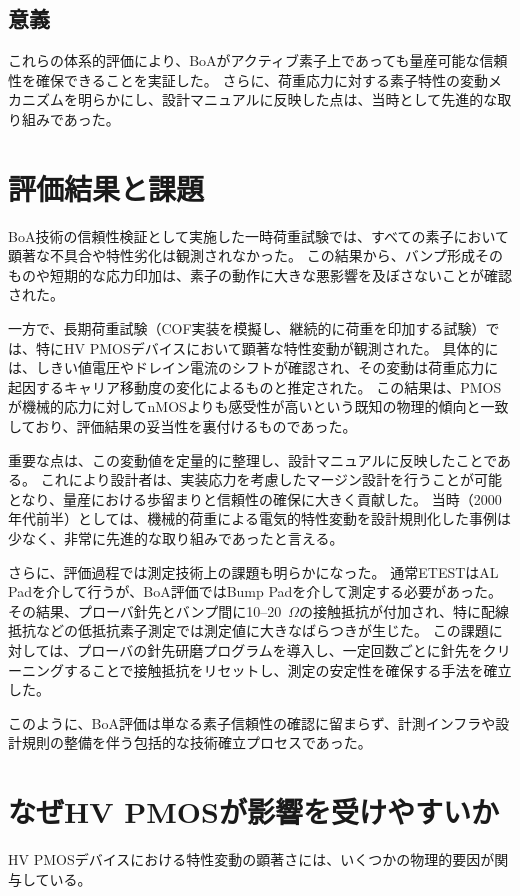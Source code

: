 \documentclass[conference]{IEEEtran}
\begin{document}
\subsection{意義}
これらの体系的評価により、BoAがアクティブ素子上であっても量産可能な信頼性を確保できることを実証した。  
さらに、荷重応力に対する素子特性の変動メカニズムを明らかにし、設計マニュアルに反映した点は、当時として先進的な取り組みであった。

\section{評価結果と課題}
BoA技術の信頼性検証として実施した一時荷重試験では、すべての素子において顕著な不具合や特性劣化は観測されなかった。  
この結果から、バンプ形成そのものや短期的な応力印加は、素子の動作に大きな悪影響を及ぼさないことが確認された。  

一方で、長期荷重試験（COF実装を模擬し、継続的に荷重を印加する試験）では、特にHV PMOSデバイスにおいて顕著な特性変動が観測された。  
具体的には、しきい値電圧やドレイン電流のシフトが確認され、その変動は荷重応力に起因するキャリア移動度の変化によるものと推定された。  
この結果は、PMOSが機械的応力に対してnMOSよりも感受性が高いという既知の物理的傾向と一致しており、評価結果の妥当性を裏付けるものであった。  

重要な点は、この変動値を定量的に整理し、設計マニュアルに反映したことである。  
これにより設計者は、実装応力を考慮したマージン設計を行うことが可能となり、量産における歩留まりと信頼性の確保に大きく貢献した。  
当時（2000年代前半）としては、機械的荷重による電気的特性変動を設計規則化した事例は少なく、非常に先進的な取り組みであったと言える。  

さらに、評価過程では測定技術上の課題も明らかになった。  
通常ETESTはAL Padを介して行うが、BoA評価ではBump Padを介して測定する必要があった。  
その結果、プローバ針先とバンプ間に10--20~$\Omega$の接触抵抗が付加され、特に配線抵抗などの低抵抗素子測定では測定値に大きなばらつきが生じた。  
この課題に対しては、プローバの針先研磨プログラムを導入し、一定回数ごとに針先をクリーニングすることで接触抵抗をリセットし、測定の安定性を確保する手法を確立した。  

このように、BoA評価は単なる素子信頼性の確認に留まらず、計測インフラや設計規則の整備を伴う包括的な技術確立プロセスであった。

\section{なぜHV PMOSが影響を受けやすいか}
HV PMOSデバイスにおける特性変動の顕著さには、いくつかの物理的要因が関与している。  
\end{document}

